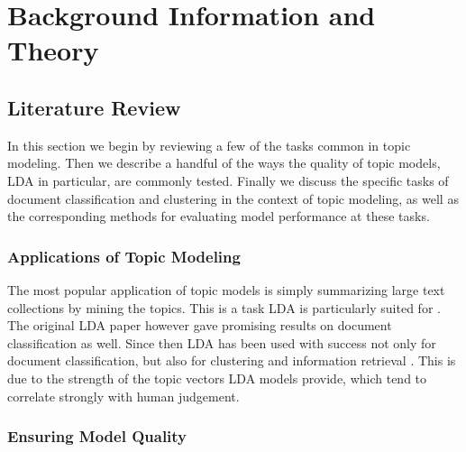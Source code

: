 \chapter{Background Information and Theory} 
\label{Chapter2} 


\section{Literature Review} \label{litreview}

In this section we begin by reviewing a few of the tasks common in topic modeling. Then we describe a handful of the ways the quality of topic models, LDA in particular, are commonly tested. Finally we discuss the specific tasks of document classification and clustering in the context of topic modeling, as well as the corresponding methods for evaluating model performance at these tasks. 

\subsection{Applications of Topic Modeling}
The most popular application of topic models is simply summarizing large text collections by mining the topics. This is a task LDA is particularly suited for \parencite{griffiths_steyvers04, Mei:2007:ALM:1281192.1281246}. The original LDA paper however \parencite{Blei:2003:LDA:944919.944937} gave promising results on document classification as well. Since then LDA has been used with success not only for document classification, but also for clustering and information retrieval \parencite{Wei:2006:LDM:1148170.1148204, Nagwani2015}. This is due to the strength of the topic vectors LDA models provide, which tend to correlate strongly with human judgement. 


\subsection{Ensuring Model Quality}
